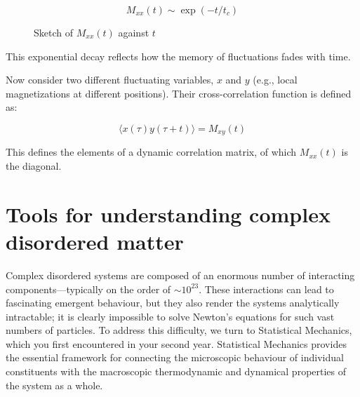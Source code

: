 \documentclass[
  letterpaper,
  DIV=11,
  numbers=noendperiod]{scrreprt}
\begin{document}
\[
M_{xx}(t) \sim \exp(-t / t_c)
\]

\begin{figure}


\caption{\label{fig-Mxx}Sketch of \(M_{xx}(t)\) against \(t\)}

\end{figure}%

This exponential decay reflects how the memory of fluctuations fades
with time.

Now consider two different fluctuating variables, \(x\) and \(y\) (e.g.,
local magnetizations at different positions). Their cross-correlation
function is defined as:

\[
\langle x(\tau) y(\tau + t) \rangle = M_{xy}(t)
\]

This defines the elements of a dynamic correlation matrix, of which
\(M_{xx}(t)\) is the diagonal.

\chapter*{Tools for understanding complex disordered
matter}\label{tools-for-understanding-complex-disordered-matter}


Complex disordered systems are composed of an enormous number of
interacting components---typically on the order of \(\sim 10^{23}\).
These interactions can lead to fascinating emergent behaviour, but they
also render the systems analytically intractable; it is clearly
impossible to solve Newton's equations for such vast numbers of
particles. To address this difficulty, we turn to Statistical Mechanics,
which you first encountered in your second year. Statistical Mechanics
provides the essential framework for connecting the microscopic
behaviour of individual constituents with the macroscopic thermodynamic
and dynamical properties of the system as a whole.
\end{document}
